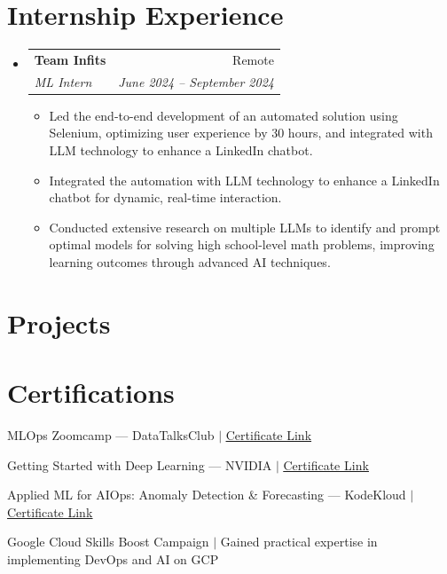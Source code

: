 \documentclass[letterpaper,10pt]{article}
\makeatletter
\newcommand{\resumeItem}[1]{
  \item{\small\setlength{\baselineskip}{10pt} #1 \vspace{-2pt}}
}
\newcommand{\resumeSubheading}[4]{
  \vspace{-2pt}\item
    \begin{tabular*}{\textwidth}[t]{@{}p{0.75\textwidth}@{\extracolsep{\fill}}r@{}}
      \textbf{#1} & \small #2 \\
      \textit{\small#3} & \textit{\small #4} \\
    \end{tabular*}\vspace{-4pt}
}
\newcommand{\resumeProjectHeading}[2]{
    \item
    \begin{tabular*}{\textwidth}{@{}l@{\extracolsep{\fill}}r@{}}
      \small#1 & \small\textit{#2} \\
    \end{tabular*}\vspace{-4pt}
}
\newcommand{\resumeSubHeadingListStart}{\begin{itemize}[leftmargin=0in, label={}, topsep=0pt, partopsep=0pt]}
\newcommand{\resumeSubHeadingListEnd}{\end{itemize}}
\newcommand{\resumeItemListStart}{\begin{itemize}[leftmargin=0.15in, label={$\bullet$}, topsep=0pt, partopsep=0pt, itemsep=3pt, parsep=0pt]}
\newcommand{\resumeItemListEnd}{\end{itemize}}
\makeatother
\begin{document}
\section{Internship Experience}
\resumeSubHeadingListStart
  \resumeSubheading
    {Team Infits}{Remote}
    {ML Intern}{June 2024 -- September 2024}
    \resumeItemListStart
      \resumeItem{Led the end-to-end development of an automated solution using Selenium, optimizing user experience by 30 hours, and integrated with LLM technology to enhance a LinkedIn chatbot.}
      \resumeItem{Integrated the automation with LLM technology to enhance a LinkedIn chatbot for dynamic, real-time interaction.}
      \resumeItem{Conducted extensive research on multiple LLMs to identify and prompt optimal models for solving high school-level math problems, improving learning outcomes through advanced AI techniques.}
    \resumeItemListEnd
\resumeSubHeadingListEnd
\section{Projects}
\resumeSubHeadingListStart
\resumeSubHeadingListEnd
\section{Certifications}
\begin{itemize}[leftmargin=0in, label={}, itemsep=0pt, parsep=0pt, topsep=0pt, partopsep=0pt]
  \small{
    \item MLOps Zoomcamp --- DataTalksClub $|$ \href{https://certificate.datatalks.club/mlops-zoomcamp/2025/bcf4ead282968541b9bad62738afe665372cc85a.pdf}{\underline{Certificate Link}}
    \item Getting Started with Deep Learning --- NVIDIA $|$ \href{https://learn.nvidia.com/certificates?id=QRIzjtaaQJaHCNYJVC9SSQ}{\underline{Certificate Link}}
    \item Applied ML for AIOps: Anomaly Detection \& Forecasting --- KodeKloud $|$ \href{https://learn.kodekloud.com/certificate/314c648f-e213-4857-9e32-a161e1499e50}{\underline{Certificate Link}}
    \item Google Cloud Skills Boost Campaign $|$ Gained practical expertise in implementing DevOps and AI on GCP
  }
\end{itemize}
\end{document}
